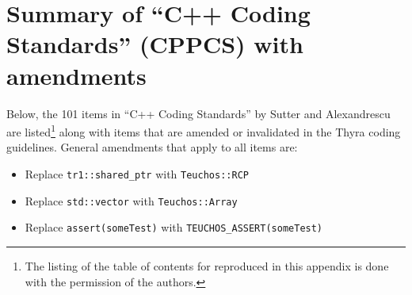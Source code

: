 %
\section{Summary of ``C++ Coding Standards'' (CPPCS) with amendments}
\label{sec:cpp_coding_standards}
%



Below, the 101 items in ``C++ Coding Standards'' by Sutter and
Alexandrescu {}\cite{C++CodingStandards05} are listed\footnote{The
listing of the table of contents for {}\cite{C++CodingStandards05}
reproduced in this appendix is done with the permission of the
authors.} along with items that are amended or invalidated in the
Thyra coding guidelines.  General amendments that apply to all items
are:

\begin{itemize}

{}\item Replace {}\texttt{tr1::shared\_ptr} with {}\texttt{Teuchos::RCP}

{}\item Replace {}\texttt{std::vector} with {}\texttt{Teuchos::Array}

{}\item Replace {}\texttt{assert(someTest)} with
{}\texttt{TEUCHOS\_ASSERT(someTest)}

\end{itemize}

